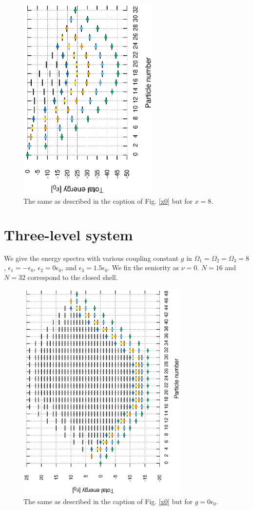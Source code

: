 \documentclass[11pt]{book} %
\begin{document}
\begin{figure}[htbp]
 \begin{center}
  \includegraphics[width=70mm,angle=-90]{images/spectra_x8.eps}
 \end{center}
 \caption{The same as described in the caption of Fig. \ref{x0} but for $x=8$.
	}
 \label{x8}
\end{figure}

\newpage

\section{Three-level system}
We give the energy spectra with various coupling constant $g$ in $\Omega_1=\Omega_2=\Omega_3=8$, $\epsilon_1=-\epsilon_0$, $\epsilon_2=0\epsilon_0$, and $\epsilon_3=1.5\epsilon_0$. We fix the seniority as $\nu=0$. $N=16$ and $N=32$ correspond to the closed shell.

\begin{figure}[htbp]
 \begin{center}
  \includegraphics[width=85mm,angle=-90]{images/spectra_g0.eps}
 \end{center}
 \caption{The same as described in the caption of Fig. \ref{x0} but for $g=0\epsilon_0$.
	}
 \label{g0}
\end{figure}
\end{document}
